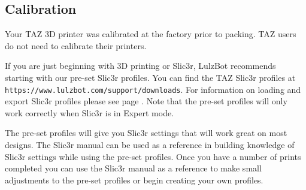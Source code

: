 
\subsection{Calibration}
\label{calibration}

Your TAZ 3D printer was calibrated at the factory prior to packing. TAZ users do not need to calibrate their printers. 


If you are just beginning with 3D printing or Slic3r, LulzBot recommends starting with our pre-set Slic3r profiles. You can find the TAZ Slic3r profiles at \texttt{https://www.lulzbot.com/support/downloads}. For information on loading and export Slic3r profiles please see page \pageref{sub:exporting_and_importing_configuration}. Note that the pre-set profiles will only work correctly when Slic3r is in Expert mode.

The pre-set profiles will give you Slic3r settings that will work great on most designs. The Slic3r manual can be used as a reference in building knowledge of Slic3r settings while using the pre-set profiles. Once you have a number of prints completed you can use the Slic3r manual as a reference to make small adjustments to the pre-set profiles or begin creating your own profiles.
